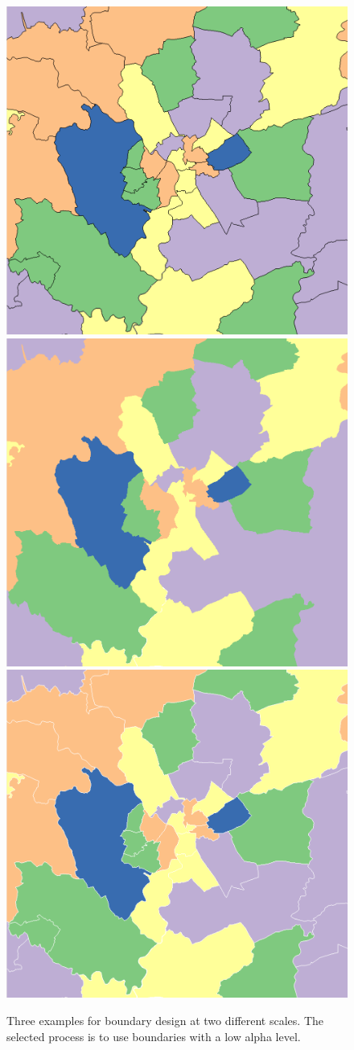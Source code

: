 \begin{figure}[ht] \centering
\subfloat
{\includegraphics[width=0.3\linewidth]{images/boundaryBlack2}}
\subfloat
{\includegraphics[width=0.3\linewidth]{images/boundaryNone2}}
\subfloat
{\includegraphics[width=0.3\linewidth]{images/boundaryWhite2}}\\ \setcounter{subfigure}{0}
\caption{Three examples for boundary design at two different scales. The selected process is to use boundaries with a low alpha level. }\label{fig:boundaries}
\end{figure}

